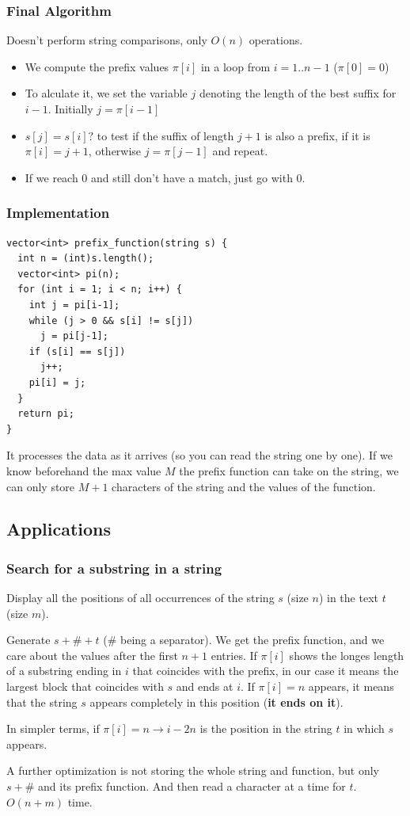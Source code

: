 \documentclass{IEEEtran}
\begin{document}
      \subsubsection{Final Algorithm}
        Doesn't perform string comparisons, only $O(n)$ operations.
        \begin{itemize}
          \item We compute the prefix values $\pi[i]$ in a loop from $i=1..n-1$ ($\pi[0]=0$)
          \item To alculate it, we set the variable $j$ denoting the length of the best suffix for $i-1$. Initially $j=\pi[i-1]$
          \item $s[j]=s[i]?$ to test if the suffix of length $j+1$ is also a prefix, if it is $\pi[i]=j+1$, otherwise $j=\pi[j-1]$ and repeat.
          \item If we reach 0 and still don't have a match, just go with 0.
        \end{itemize}
      \subsubsection{Implementation}
        \begin{lstlisting}
vector<int> prefix_function(string s) {
  int n = (int)s.length();
  vector<int> pi(n);
  for (int i = 1; i < n; i++) {
    int j = pi[i-1];
    while (j > 0 && s[i] != s[j])
      j = pi[j-1];
    if (s[i] == s[j])
      j++;
    pi[i] = j;
  }
  return pi;
}
        \end{lstlisting}
        \par It processes the data as it arrives (so you can read the string one by one). If we know beforehand the max value $M$ the prefix function can take on the string, we can only store $M+1$ characters of the string and the values of the function.
    \subsection{Applications}
      \subsubsection{Search for a substring in a string}
        Display all the positions of all occurrences of the string $s$ (size $n$) in the text $t$ (size $m$).\par 
        Generate $s+\#+t$ (\# being a separator). We get the prefix function, and we care about the values after the first $n+1$ entries. If $\pi[i]$ shows the longes length of a substring ending in $i$ that coincides with the prefix, in our case it means the largest block that coincides with $s$ and ends at $i$. If $\pi[i]=n$ appears, it means that the string $s$ appears completely in this position (\textbf{it ends on it}).\par 
        In simpler terms, if $\pi[i]=n\to i-2n$ is the position in the string $t$ in which $s$ appears.\par
        A further optimization is not storing the whole string and function, but only $s+\#$ and its prefix function. And then read a character at a time for $t$. $O(n+m)$ time.
\end{document}
